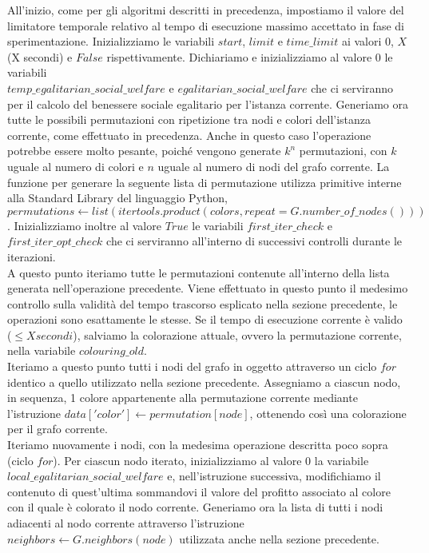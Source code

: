 \newpage
All'inizio, come per gli algoritmi descritti in precedenza, impostiamo il valore del limitatore temporale relativo al tempo di esecuzione massimo accettato in fase di sperimentazione. Inizializziamo le variabili $start$, $limit$ e $time\_limit$ ai valori $0$, $X$ (X secondi) e $False$ rispettivamente. Dichiariamo e inizializziamo al valore $0$ le variabili \\
$temp\_egalitarian\_social\_welfare$ e $egalitarian\_social\_welfare$ che ci serviranno per il calcolo del benessere sociale egalitario per l'istanza corrente. Generiamo ora tutte le possibili permutazioni con ripetizione tra nodi e colori dell'istanza corrente, come effettuato in precedenza. Anche in questo caso l'operazione potrebbe essere molto pesante, poiché vengono generate \(k^n\) permutazioni, con $k$ uguale al numero di colori e $n$ uguale al numero di nodi del grafo corrente. La funzione per generare la seguente lista di permutazione utilizza primitive interne alla Standard Library del linguaggio Python, $permutations\gets list(itertools.product(colors, repeat=G.number\_of\_nodes()))$. Inizializziamo inoltre al valore $True$ le variabili $first\_iter\_check$ e $first\_iter\_opt\_check$ che ci serviranno all'interno di successivi controlli durante le iterazioni.\\
A questo punto iteriamo tutte le permutazioni contenute all'interno della lista generata nell'operazione precedente. Viene effettuato in questo punto il medesimo controllo sulla validità del tempo trascorso esplicato nella sezione precedente, le operazioni sono esattamente le stesse. Se il tempo di esecuzione corrente è valido (\(\leq X secondi\)), salviamo la colorazione attuale, ovvero la permutazione corrente, nella variabile $colouring\_old$.\\
Iteriamo a questo punto tutti i nodi del grafo in oggetto attraverso un ciclo $for$ identico a quello utilizzato nella sezione precedente. Assegniamo a ciascun nodo, in sequenza, 1 colore appartenente alla permutazione corrente mediante l'istruzione $data['color']\gets permutation[node]$, ottenendo così una colorazione per il grafo corrente.\\
Iteriamo nuovamente i nodi, con la medesima operazione descritta poco sopra (ciclo $for$). Per ciascun nodo iterato, inizializziamo al valore $0$ la variabile \\
$local\_egalitarian\_social\_welfare$ e, nell'istruzione successiva, modifichiamo il contenuto di quest'ultima sommandovi il valore del profitto associato al colore con il quale è colorato il nodo corrente. Generiamo ora la lista di tutti i nodi adiacenti al nodo corrente attraverso l'istruzione $neighbors\gets G.neighbors(node)$ utilizzata anche nella sezione precedente.\\
